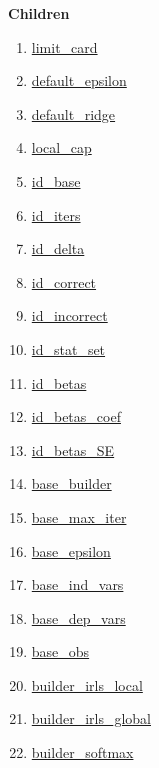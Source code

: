 \textbf{Children}
\begin{enumerate}
\item \hyperlink{ecldoc:logisticregression.constants.limit_card}{limit\_card}
\item \hyperlink{ecldoc:logisticregression.constants.default_epsilon}{default\_epsilon}
\item \hyperlink{ecldoc:logisticregression.constants.default_ridge}{default\_ridge}
\item \hyperlink{ecldoc:logisticregression.constants.local_cap}{local\_cap}
\item \hyperlink{ecldoc:logisticregression.constants.id_base}{id\_base}
\item \hyperlink{ecldoc:logisticregression.constants.id_iters}{id\_iters}
\item \hyperlink{ecldoc:logisticregression.constants.id_delta}{id\_delta}
\item \hyperlink{ecldoc:logisticregression.constants.id_correct}{id\_correct}
\item \hyperlink{ecldoc:logisticregression.constants.id_incorrect}{id\_incorrect}
\item \hyperlink{ecldoc:logisticregression.constants.id_stat_set}{id\_stat\_set}
\item \hyperlink{ecldoc:logisticregression.constants.id_betas}{id\_betas}
\item \hyperlink{ecldoc:logisticregression.constants.id_betas_coef}{id\_betas\_coef}
\item \hyperlink{ecldoc:logisticregression.constants.id_betas_se}{id\_betas\_SE}
\item \hyperlink{ecldoc:logisticregression.constants.base_builder}{base\_builder}
\item \hyperlink{ecldoc:logisticregression.constants.base_max_iter}{base\_max\_iter}
\item \hyperlink{ecldoc:logisticregression.constants.base_epsilon}{base\_epsilon}
\item \hyperlink{ecldoc:logisticregression.constants.base_ind_vars}{base\_ind\_vars}
\item \hyperlink{ecldoc:logisticregression.constants.base_dep_vars}{base\_dep\_vars}
\item \hyperlink{ecldoc:logisticregression.constants.base_obs}{base\_obs}
\item \hyperlink{ecldoc:logisticregression.constants.builder_irls_local}{builder\_irls\_local}
\item \hyperlink{ecldoc:logisticregression.constants.builder_irls_global}{builder\_irls\_global}
\item \hyperlink{ecldoc:logisticregression.constants.builder_softmax}{builder\_softmax}
\end{enumerate}

